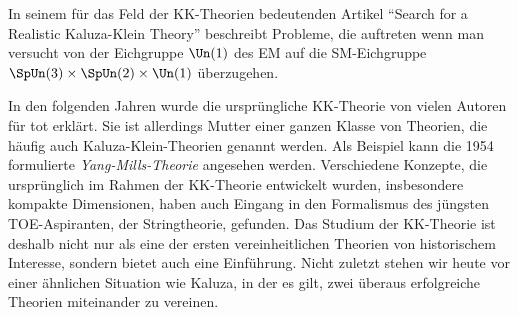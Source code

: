 In seinem für das
Feld der KK-Theorien bedeutenden Artikel \enquote{Search for a Realistic
Kaluza-Klein Theory} beschreibt
 Probleme, die auftreten wenn man versucht 
von der Eichgruppe $\Un(1)$ des EM auf die SM-Eichgruppe $\SpUn(3)\times
\SpUn(2) \times \Un(1)$ überzugehen.
%

In den folgenden Jahren wurde die ursprüngliche KK-Theorie von vielen
Autoren für tot erklärt.
Sie ist allerdings Mutter einer ganzen Klasse von Theorien, die häufig auch
Kaluza-Klein-Theorien genannt werden. Als Beispiel kann die 1954 formulierte 
\emph{Yang-Mills-Theorie} angesehen werden.
Verschiedene Konzepte, die ursprünglich im
Rahmen der KK-Theorie entwickelt wurden, insbesondere kompakte Dimensionen,
haben auch Eingang in den Formalismus des jüngsten
TOE-Aspiranten, der Stringtheorie, gefunden.
Das Studium der KK-Theorie ist deshalb nicht nur als eine der ersten
vereinheitlichen Theorien von historischem Interesse, sondern bietet auch eine
Einführung. Nicht zuletzt stehen wir heute vor einer ähnlichen Situation
wie Kaluza, in der es gilt, zwei überaus erfolgreiche Theorien miteinander zu vereinen. 

